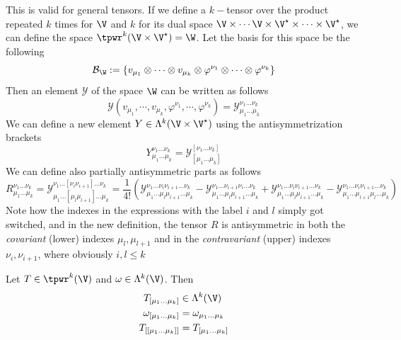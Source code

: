 \documentclass[../mmf.tex]{subfiles}
\begin{document}
\begin{dfn}
	This is valid for general tensors. If we define a $k-$tensor over the product repeated $k$ times for $\V$ and $k$ for its dual space $\V\times\cdots\V\times\V^\star\times\cdots\times\V^\star$, we can define the space $\tpwr^{k}(\V\times\V^\star)=\W$. Let the basis for this space be the following
	\begin{equation*}
		\mathcal{B}_{\W}:=\{v_{\mu_1}\otimes\cdots\otimes v_{\mu_k}\otimes\varphi^{\nu_1}\otimes\cdots\otimes\varphi^{\nu_k}\}
	\end{equation*}
	Then an element $\mathcal{Y}$ of the space $\W$ can be written as follows
	\begin{equation*}
		\mathcal{Y}(v_{\mu_1},\cdots,v_{\mu_k},\varphi^{\nu_1},\cdots,\varphi^{\nu_k})=\mathcal{Y}^{\nu_1\ldots\nu_k}_{\mu_1\ldots\mu_k}
	\end{equation*}
	We can define a new element $Y\in\Lambda^k(\V\times\V^\star)$ using the antisymmetrization brackets
	\begin{equation*}
		Y^{\nu_1\ldots\nu_k}_{\mu_1\ldots\mu_k}=\mathcal{Y}^{[\nu_1\ldots\nu_k]}_{[\mu_1\ldots\mu_k]}
	\end{equation*}
	We can define also partially antisymmetric parts as follows
	\begin{equation*}
		R^{\nu_1\ldots\nu_k}_{\mu_1\ldots\mu_k}=\mathcal{Y}^{\nu_1\ldots[\nu_i\nu_{i+1}]\ldots\nu_k}_{\mu_1\ldots[\mu_{l}\mu_{l+1}]\ldots\mu_k}=\frac{1}{4!}\left( \mathcal{Y}^{\nu_1\ldots\nu_i\nu_{i+1}\ldots\nu_k}_{\mu_1\ldots\mu_{l}\mu_{l+1}\ldots\mu_k}-\mathcal{Y}^{\nu_1\ldots\nu_{i+1}\nu_{i}\ldots\nu_k}_{\mu_1\ldots\mu_{l}\mu_{l+1}\ldots\mu_k}+\mathcal{Y}^{\nu_1\ldots\nu_i\nu_{i+1}\ldots\nu_k}_{\mu_1\ldots\mu_{l}\mu_{l+1}\ldots\mu_k}-\mathcal{Y}^{\nu_1\ldots\nu_i\nu_{i+1}\ldots\nu_k}_{\mu_1\ldots\mu_{l+1}\mu_{l}\ldots\mu_k} \right)
	\end{equation*}
	Note how the indexes in the expressions with the label $i$ and $l$ simply got switched, and in the new definition, the tensor $R$ is antisymmetric in both the \textit{covariant} (lower) indexes $\mu_l,\mu_{l+1}$ and in the \textit{contravariant} (upper) indexes $\nu_i,\nu_{i+1}$, where obviously $i,l\le k$
\end{dfn}
\begin{thm}
	Let $T\in\tpwr^k(\V)$ and $\omega\in\Lambda^k(\V)$. Then
	\begin{equation}
		\begin{aligned}
			T_{[\mu_1\ldots\mu_k]}&\in\Lambda^k(\V)\\
			\omega_{[\mu_1\ldots\mu_k]}&=\omega_{\mu_1\ldots\mu_k}\\
			T_{[[\mu_1\ldots\mu_k]]}&=T_{[\mu_1\ldots\mu_k]}
		\end{aligned}
		\label{eq:propalt}
	\end{equation}
\end{thm}
\end{document}
